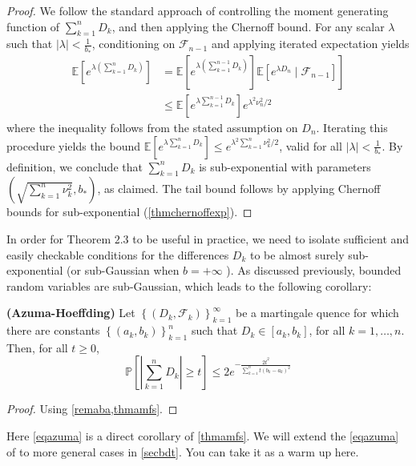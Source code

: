 \documentclass{article}
\newcommand{\bfs}[1]{\textbf{({#1})}}
\begin{document}
\begin{proof}
We follow the standard approach of controlling the moment generating function of $\sum_{k=1}^{n} D_{k}$, and then applying the Chernoff bound. For any scalar $\lambda$ such that $|\lambda|<\frac{1}{b_{*}}$, conditioning on $\mathcal{F}_{n-1}$ and applying iterated expectation yields
$$
\begin{aligned}
\mathbb{E}\left[e^{\lambda\left(\sum_{k=1}^{n} D_{k}\right)}\right] &\left.=\mathbb{E}\left[e^{\lambda\left(\sum_{k=1}^{n-1} D_{k}\right)}\right] \mathbb{E}\left[e^{\lambda D_{n}} \mid \mathcal{F}_{n-1}\right]\right] \\
& \leq \mathbb{E}\left[e^{\lambda \sum_{k=1}^{n-1} D_{k}}\right] e^{\lambda^{2} \nu_{n}^{2} / 2}
\end{aligned}
$$
where the inequality follows from the stated assumption on $D_{n}$. Iterating this procedure yields the bound $\mathbb{E}\left[e^{\lambda \sum_{k=1}^{n} D_{k}}\right] \leq e^{\lambda^{2} \sum_{k=1}^{n} \nu_{k}^{2} / 2}$, valid for all $|\lambda|<\frac{1}{b_{*}} .$ By definition, we
conclude that $\sum_{k=1}^{n} D_{k}$ is sub-exponential with parameters $\left(\sqrt{\sum_{k=1}^{n} \nu_{k}^{2}}, b_{*}\right)$, as claimed. The tail bound follows by applying Chernoff bounds for sub-exponential (\cref{thmchernoffexp}).
\end{proof} 

In order for Theorem $2.3$ to be useful in practice, we need to isolate sufficient and easily checkable conditions for the differences $D_{k}$ to be almost surely sub-exponential (or sub-Gaussian when $b=+\infty$ ). As discussed previously, bounded random variables are sub-Gaussian, which leads to the following corollary:

\begin{cora}{\bfs{Azuma-Hoeffding}}\label{eqazuma}
 Let $\left\{\left(D_{k}, \mathcal{F}_{k}\right)\right\}_{k=1}^{\infty}$ be a martingale quence for which there are constants $\left\{\left(a_{k}, b_{k}\right)\right\}_{k=1}^{n}$ such that $D_{k} \in\left[a_{k}, b_{k}\right]$, for all $k=1, \ldots, n .$ Then, for all $t \geq 0$,
$$
\mathbb{P}\left[\left|\sum_{k=1}^{n} D_{k}\right| \geq t\right] \leq 2 e^{-\frac{2 t^{2}}{\sum_{k=1}^{n} t (b_{k}-a_{k})^{2}}}
$$
\end{cora} 
\begin{proof}
Using \cref{remaba,thmamfs}.
\end{proof} 
\begin{rema}
Here \cref{eqazuma} is a direct corollary of \cref{thmamfs}. We will extend the \cref{eqazuma} of  to more general cases in \cref{secbdt}. You can take it as a warm up here.
\end{rema}
\end{document}
